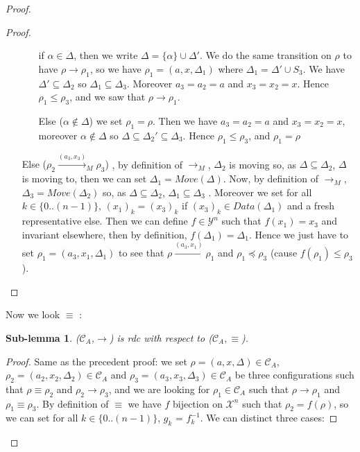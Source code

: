 \documentclass[a4paper,10pt]{report}
\newtheorem{slm}{Sub-lemma}[lm]
\theoremstyle{remark}
\newcommand{\seg}[1]{\{#1\}}
\newcommand{\ts}{\seg{0 .. (n-1)}}
\newcommand{\C}{\mathcal{C}_{A}}
\newcommand{\X}{\mathcal{X}^{n}}
\newcommand{\Y}{\mathcal{Y}^{n}}
\begin{document}
\begin{proof}
\begin{proof}
\begin{itemize}
      \begin{itemize}
	\item [if $\alpha \in \Delta$,] then we write $\Delta = \{\alpha \} \cup \Delta'$.  
	We do the same transition on $\rho$ to have $\rho \rightarrow \rho_1$, so we have $\rho_1 = (a,x,\Delta_1)$ where $\Delta_1 = \Delta' \cup S_3$. 
	We have $\Delta' \subseteq \Delta_2$ so $\Delta_1 \subseteq \Delta_3$.
	Moreover $a_3= a_2 = a$ and $x_3 = x_2 = x$.
	Hence $\rho_1 \leq \rho_3$, and we saw that $\rho \rightarrow \rho_1$.
	\item [Else ($\alpha \notin \Delta$)] we set $\rho_1 = \rho$. Then we have $a_3= a_2 = a$ and $x_3 = x_2 = x$, moreover $\alpha \notin \Delta $ so $\Delta \subseteq \Delta_2' \subseteq \Delta_3$.
	Hence $\rho_1 \leq \rho_3$, and $\rho_1 = \rho$ 
      \end{itemize}
     \item [Else ($\rho_2 \xrightarrow{(a_3,x_3)}_{M} \rho_3$)],  
     by definition of $\rightarrow_{M}$, $\Delta_2$ is moving so, as $\Delta \subseteq \Delta_2$, $\Delta$ is moving to, then we can set $\Delta_1 = Move(\Delta)$.
     Now, by definition of $\rightarrow_{M}$, $\Delta_3 = Move(\Delta_2)$ so,
     as $\Delta \subseteq \Delta_2$, $\Delta_1 \subseteq \Delta_3$ .
     Moreover we set for all $k \in \ts$, ${(x_1)}_k = {(x_3)}_k$ if ${(x_3)}_k \in Data(\Delta_1)$ and a fresh representative else.
     Then we can define $f \in \Y$ such that $f(x_1) = x_3$ and invariant elsewhere, then by definition, $f(\Delta_1) = \Delta_1$.
     Hence we just have to set $\rho_1 = (a_3,x_1,\Delta_1)$ to see that $\rho \xrightarrow{(a_3,x_1)} \rho_1$ and $\rho_1 \preceq \rho_3$ (cause $f(\rho_1) \leq \rho_3$).
    \end{itemize}   
  \end{proof}
  Now we look $\equiv$ :
  \begin{slm}
    ($\C$,$\rightarrow$) is rdc with respect to ($\C,\equiv$).
  \end{slm}
  \begin{proof}
    Same as the precedent proof: we set $\rho = (a,x,\Delta) \in \C$, $\rho_2 = (a_2,x_2,\Delta_2) \in \C$ and $\rho_3 = (a_3,x_3,\Delta_3) \in \C$ be three configurations
   such that $\rho \equiv \rho_2$ and $\rho_2 \rightarrow \rho_3$, and we are looking for $\rho_1 \in \C$ such that $\rho \rightarrow \rho_1$  and $\rho_1 \equiv \rho_3$.
   By definition of $\equiv$ we have $f$ bijection on $\X$ such that $\rho_2 = f(\rho)$, so we can set for all $k \in \ts$, $g_k$ = $f_k^{-1}$.
   We can distinct three cases:

\end{proof}
\end{proof}
\end{document}
